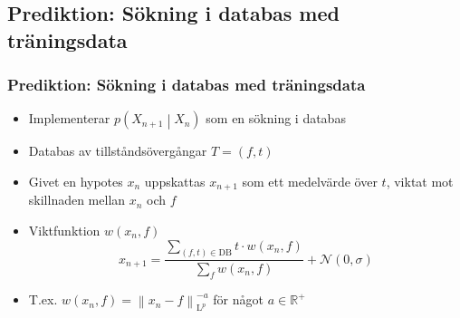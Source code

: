 \documentclass[]{beamer}
\renewcommand{\ae}{\"{a}}
\renewcommand{\oe}{\"{o}}
\newcommand{\prob}[1]{p\left(#1\right)}
\newcommand{\cprob}[2]{\prob{\left. #1 \middle\vert #2 \right.}}
\newcommand{\cprobnext}[1]{\cprob{#1_{n+1}}{#1_n}}
\newcommand{\ndist}[2]{\mathcal{N}\left(#1, #2\right)}
\newcommand{\norm}[1]{\left\|#1\right\|}
\newcommand{\Lp}[1]{\mathrm{L}^{#1}}
\newcommand{\bbset}[1]{\mathbb{#1}}
\newcommand{\RP}{\bbset{R}^+}
\begin{document}
\subsection{Prediktion: S\oe kning i databas med tr\ae ningsdata}
\begin{frame}
  \frametitle{Prediktion: S\oe kning i databas med tr\ae ningsdata}
  \begin{itemize}
  \item Implementerar $\cprobnext{X}$ som en s\oe kning i databas
  \item Databas av tillst\aa nds\oe verg\aa ngar $T = (f, t)$
  \item Givet en hypotes $x_n$ uppskattas $x_{n+1}$ som ett medelv\ae rde \oe ver $t$, viktat mot skillnaden mellan $x_n$ och $f$
  \item Viktfunktion $w(x_n, f)$
    \begin{equation*}
      x_{n+1} = \frac{\sum\limits_{(f, t) \in \mathrm{DB}} t \cdot w(x_n, f)}{\sum\limits_f w(x_n, f)} + \ndist{0}{\sigma}
    \end{equation*}
  \item T.ex. $w(x_n, f) = \norm{x_n - f}_{\Lp{p}}^{-a}$ f\oe r n\aa got $a\in \RP$
  \end{itemize}
\end{frame}
\end{document}
